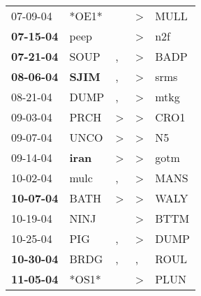 \begin{supertabular}{p{0.07\textwidth}p{0.06\textwidth}p{0.02\textwidth}p{0.02\textwidth}p{0.06\textwidth}}
          07-09-04\textsuperscript{} &                            *OE1* &                  &     \textgreater &           MULL\textsuperscript{} \\
 \textbf{07-15-04\textsuperscript{}} &           peep\textsuperscript{} &                  &     \textgreater &            n2f\textsuperscript{} \\
 \textbf{07-21-04\textsuperscript{}} &           SOUP\textsuperscript{} &                , &     \textgreater &           BADP\textsuperscript{} \\
 \textbf{08-06-04\textsuperscript{}} &  \textbf{SJIM\textsuperscript{}} &                , &     \textgreater &           srms\textsuperscript{} \\
          08-21-04\textsuperscript{} &           DUMP\textsuperscript{} &                , &     \textgreater &           mtkg\textsuperscript{} \\
          09-03-04\textsuperscript{} &           PRCH\textsuperscript{} &     \textgreater &     \textgreater &           CRO1\textsuperscript{} \\
          09-07-04\textsuperscript{} &           UNCO\textsuperscript{} &     \textgreater &     \textgreater &             N5\textsuperscript{} \\
          09-14-04\textsuperscript{} &  \textbf{iran\textsuperscript{}} &     \textgreater &     \textgreater &           gotm\textsuperscript{} \\
          10-02-04\textsuperscript{} &           mulc\textsuperscript{} &                , &     \textgreater &           MANS\textsuperscript{} \\
 \textbf{10-07-04\textsuperscript{}} &           BATH\textsuperscript{} &     \textgreater &     \textgreater &           WALY\textsuperscript{} \\
          10-19-04\textsuperscript{} &           NINJ\textsuperscript{} &                  &     \textgreater &           BTTM\textsuperscript{} \\
          10-25-04\textsuperscript{} &            PIG\textsuperscript{} &                , &     \textgreater &           DUMP\textsuperscript{} \\
 \textbf{10-30-04\textsuperscript{}} &           BRDG\textsuperscript{} &                , &                , &           ROUL\textsuperscript{} \\
 \textbf{11-05-04\textsuperscript{}} &                            *OS1* &                  &     \textgreater &           PLUN\textsuperscript{} \\

\end{supertabular}
